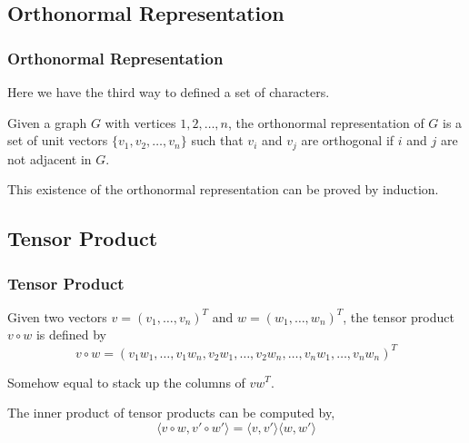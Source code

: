 \subsection{Orthonormal Representation}

      \begin{frame}
            \frametitle{Orthonormal Representation}

            Here we have the third way to defined a set of characters.

            \begin{definition}\label{def:orthonormalRepresentation}
                  Given a graph $ G $ with vertices $ 1,2,\dots,n $, the orthonormal representation of $ G $ is a set of unit vectors $ \{v_1, v_2, \dots, v_n\} $ such that $ v_i $ and $ v_j $ are orthogonal if $ i $ and $ j $ are not adjacent in $ G $.
            \end{definition}

            \pause

            This existence of the orthonormal representation can be proved by induction.

      \end{frame}

\subsection{Tensor Product}

      \begin{frame}
            \frametitle{Tensor Product}
            \begin{definition}\label{def:tensorProduct}
                  Given two vectors $ v = \left(v_{1},\dots,v_{n}\right)^{T} $ and $ w = \left(w_{1},\dots,w_{n}\right)^{T} $, the tensor product $ v \circ w $ is defined by
                  \begin{equation}
                        v \circ w = \left(
                              v_{1}w_{1},\dots,v_{1}w_{n},
                              v_{2}w_{1},\dots,v_{2}w_{n},
                              \dots,
                              v_{n}w_{1},\dots,v_{n}w_{n}
                              \right)^{T}
                  \end{equation}

                  Somehow equal to stack up the columns of $ v w^{T} $.
            \end{definition}

            \pause

            \begin{lemma}
                  The inner product of tensor products can be computed by,
                  \begin{equation}
                        \langle v \circ w, v' \circ w' \rangle = \langle v, v' \rangle \langle w, w' \rangle
                  \end{equation}
            \end{lemma}

      \end{frame}

